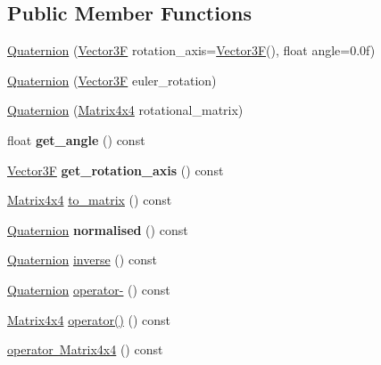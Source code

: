 \subsection*{Public Member Functions}
\begin{DoxyCompactItemize}
\item 
\mbox{\hyperlink{class_quaternion_a2f9345c4e4ea54370b26cce4d5b075c2}{Quaternion}} (\mbox{\hyperlink{class_vector3}{Vector3F}} rotation\+\_\+axis=\mbox{\hyperlink{class_vector3}{Vector3F}}(), float angle=0.\+0f)
\item 
\mbox{\hyperlink{class_quaternion_a51e4c3b86a987b3c4b3172dac812369f}{Quaternion}} (\mbox{\hyperlink{class_vector3}{Vector3F}} euler\+\_\+rotation)
\item 
\mbox{\hyperlink{class_quaternion_a2d6a1e75c5e91321c0afef7e3ed1b354}{Quaternion}} (\mbox{\hyperlink{class_matrix4x4}{Matrix4x4}} rotational\+\_\+matrix)
\item 
\mbox{\label{class_quaternion_aca6deeefa6b6de44aa8e8dd124c6d1ab}} 
float {\bfseries get\+\_\+angle} () const
\item 
\mbox{\label{class_quaternion_ac39a2d53becfbfffe19e374acb33279d}} 
\mbox{\hyperlink{class_vector3}{Vector3F}} {\bfseries get\+\_\+rotation\+\_\+axis} () const
\item 
\mbox{\hyperlink{class_matrix4x4}{Matrix4x4}} \mbox{\hyperlink{class_quaternion_ae0309902fc8b7d8aa1f4075a73fee928}{to\+\_\+matrix}} () const
\item 
\mbox{\label{class_quaternion_a17008499e6d53e974ee4de8bbbe0cd93}} 
\mbox{\hyperlink{class_quaternion}{Quaternion}} {\bfseries normalised} () const
\item 
\mbox{\hyperlink{class_quaternion}{Quaternion}} \mbox{\hyperlink{class_quaternion_a38f69dc61e527847ab14b5b6aea5364a}{inverse}} () const
\item 
\mbox{\hyperlink{class_quaternion}{Quaternion}} \mbox{\hyperlink{class_quaternion_aff7a0a5aeea4a3fe860cb90a649e389c}{operator-\/}} () const
\item 
\mbox{\hyperlink{class_matrix4x4}{Matrix4x4}} \mbox{\hyperlink{class_quaternion_afe406f4a387794c924b0459b9514c68d}{operator()}} () const
\item 
\mbox{\hyperlink{class_quaternion_a31f2b4a704b8ba5b677d0cf7ecec163d}{operator Matrix4x4}} () const
\item 

\end{DoxyCompactItemize}
